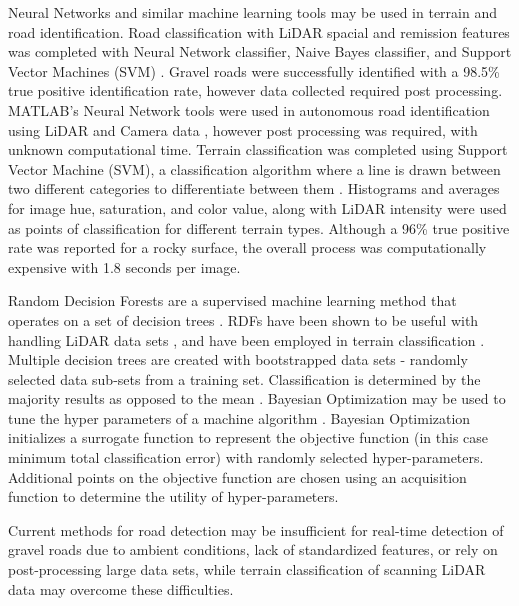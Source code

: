 \documentclass[balance,upint,subscriptcorrection,varvw,mathalfa=cal=boondoxo,colorlinks]{asmeconf}
\begin{document}
	{Neural Networks and similar machine learning tools may be used in terrain and road identification. Road classification with LiDAR spacial and remission features was completed with Neural Network classifier, Naive Bayes classifier, and Support Vector Machines (SVM) \cite{wang_road_nodate,wang_two-stage_2018}. Gravel roads were successfully identified with a 98.5\% true positive identification rate, however data collected required post processing. MATLAB's Neural Network tools were used in autonomous road identification using LiDAR and Camera data \cite{rasmussen_combining_2002}, however post processing was required, with unknown computational time.  Terrain classification was completed using Support Vector Machine (SVM), a classification algorithm where a line is drawn between two different categories to differentiate between them \cite{breiman_random_2001}. Histograms and averages for image hue, saturation, and color value, along with LiDAR intensity were used as points of classification for different terrain types. Although a 96\% true positive rate was reported for a rocky surface, the overall process was computationally expensive with 1.8 seconds per image.}
	
	{Random Decision Forests are a supervised machine learning method that operates on a set of decision trees \cite{ho_random_1995}. RDFs have been shown to be useful with handling LiDAR data sets \cite{breiman_random_2001}, and have been employed in terrain classification \cite{laible_3d_2012,laible_map_building,laible_terrain_2013,khan_high_2011,reymann_improving_2015,schilling_geometric_2017, wietrzykowski_context-aware_2019}. Multiple decision trees are created with bootstrapped data sets - randomly selected data sub-sets from a training set. Classification is determined by the majority results as opposed to the mean \cite{breiman_random_2001,ho_random_1995}. Bayesian Optimization may be used to tune the hyper parameters of a machine algorithm \cite{noauthor_bayesian_nodate, snoek_practical_2012}. Bayesian Optimization initializes a surrogate function to represent the objective function (in this case minimum total classification error) with randomly selected hyper-parameters. Additional points on the objective function are chosen using an acquisition function to determine the utility of hyper-parameters.}
	
	{Current methods for road detection may be insufficient for real-time detection of gravel roads due to ambient conditions, lack of standardized features, or rely on post-processing large data sets, while terrain classification of scanning LiDAR data may overcome these difficulties.}
	
\end{document}
